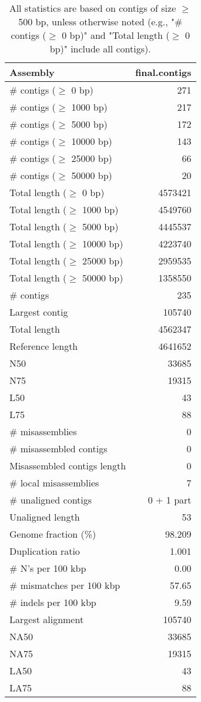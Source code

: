 \documentclass[12pt,a4paper]{article}
\begin{document}
\begin{table}[ht]
\begin{center}
\caption{All statistics are based on contigs of size $\geq$ 500 bp, unless otherwise noted (e.g., "\# contigs ($\geq$ 0 bp)" and "Total length ($\geq$ 0 bp)" include all contigs).}
\begin{tabular}{|l*{1}{|r}|}
\hline
Assembly & final.contigs \\ \hline
\# contigs ($\geq$ 0 bp) & 271 \\ \hline
\# contigs ($\geq$ 1000 bp) & 217 \\ \hline
\# contigs ($\geq$ 5000 bp) & 172 \\ \hline
\# contigs ($\geq$ 10000 bp) & 143 \\ \hline
\# contigs ($\geq$ 25000 bp) & 66 \\ \hline
\# contigs ($\geq$ 50000 bp) & 20 \\ \hline
Total length ($\geq$ 0 bp) & 4573421 \\ \hline
Total length ($\geq$ 1000 bp) & 4549760 \\ \hline
Total length ($\geq$ 5000 bp) & 4445537 \\ \hline
Total length ($\geq$ 10000 bp) & 4223740 \\ \hline
Total length ($\geq$ 25000 bp) & 2959535 \\ \hline
Total length ($\geq$ 50000 bp) & 1358550 \\ \hline
\# contigs & 235 \\ \hline
Largest contig & 105740 \\ \hline
Total length & 4562347 \\ \hline
Reference length & 4641652 \\ \hline
N50 & 33685 \\ \hline
N75 & 19315 \\ \hline
L50 & 43 \\ \hline
L75 & 88 \\ \hline
\# misassemblies & 0 \\ \hline
\# misassembled contigs & 0 \\ \hline
Misassembled contigs length & 0 \\ \hline
\# local misassemblies & 7 \\ \hline
\# unaligned contigs & 0 + 1 part \\ \hline
Unaligned length & 53 \\ \hline
Genome fraction (\%) & 98.209 \\ \hline
Duplication ratio & 1.001 \\ \hline
\# N's per 100 kbp & 0.00 \\ \hline
\# mismatches per 100 kbp & 57.65 \\ \hline
\# indels per 100 kbp & 9.59 \\ \hline
Largest alignment & 105740 \\ \hline
NA50 & 33685 \\ \hline
NA75 & 19315 \\ \hline
LA50 & 43 \\ \hline
LA75 & 88 \\ \hline
\end{tabular}
\end{center}
\end{table}
\end{document}
